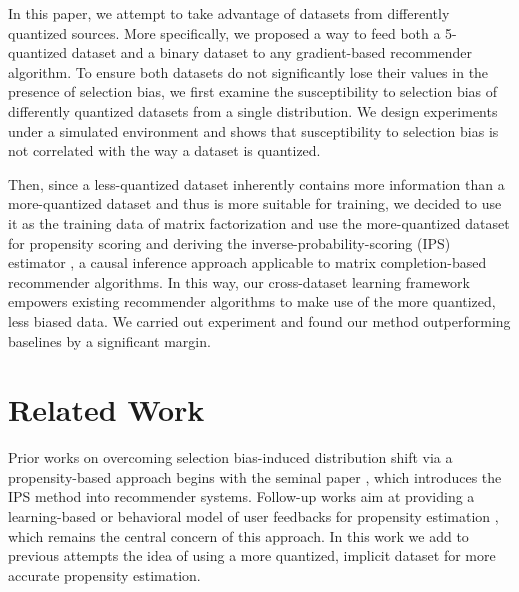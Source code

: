 \documentclass{article}
\begin{document}
In this paper, we attempt to take advantage of datasets from differently quantized sources. More specifically, we proposed a way to feed both a 5-quantized dataset and a binary dataset to any gradient-based recommender algorithm.  To ensure both datasets do not significantly lose their values in the presence of selection bias, we first examine the susceptibility to selection bias of differently quantized datasets from a single distribution. We design experiments under a simulated environment and shows that susceptibility to selection bias is not correlated with the way a dataset is quantized. 

Then, since a less-quantized dataset inherently contains more information than a more-quantized dataset \cite{widrow1996statistical} and thus is more suitable for training, we decided to use it as the training data of matrix factorization and use the more-quantized dataset for propensity scoring and deriving the inverse-probability-scoring (IPS) estimator \cite{thompson2012sampling} \cite{imbens2015causal}, a causal inference approach applicable to matrix completion-based recommender algorithms. In this way, our cross-dataset learning framework empowers existing recommender algorithms to make use of the more quantized, less biased data. We carried out experiment and found our method outperforming baselines by a significant margin.


\section{Related Work}
Prior works on overcoming selection bias-induced distribution shift via a propensity-based approach begins with the seminal paper \cite{schnabel2016recommendations}, which introduces the IPS method into recommender systems. Follow-up works aim at providing a learning-based or behavioral model of user feedbacks for propensity estimation \cite{joachims2017unbiased} \cite{yang2018unbiased}, which remains the central concern of this approach. In this work we add to previous attempts the idea of using a more quantized, implicit dataset for more accurate propensity estimation.
\end{document}
